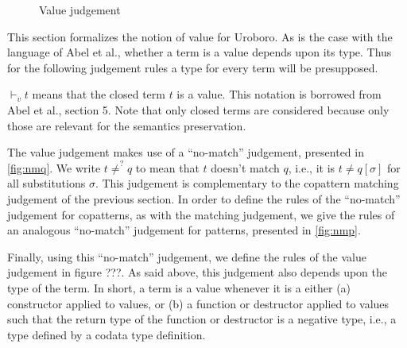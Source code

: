 \begin{figure}
\begin{prooftree}
\end{prooftree}

\begin{prooftree}
\end{prooftree}

\begin{prooftree}
\end{prooftree}
\caption{Value judgement}
\label{fig:valj}
\end{figure}

This section formalizes the notion of value for Uroboro. As is the case with the language of Abel et al.\cite{abel13copatterns}, whether a term is a value depends upon its type. Thus for the following judgement rules a type for every term will be presupposed.

$\vdash_v t$ means that the closed term $t$ is a value. This notation is borrowed from Abel et al.\cite{abel13copatterns}, section 5. Note that only closed terms are considered because only those are relevant for the semantics preservation.

The value judgement makes use of a ``no-match'' judgement, presented in \autoref{fig:nmq}. We write $t \neq^? q$ to mean that $t$ doesn't match $q$, i.e., it is $t \neq q[\sigma]$ for all substitutions $\sigma$. This judgement is complementary to the copattern matching judgement of the previous section. In order to define the rules of the ``no-match'' judgement for copatterns, as with the matching judgement, we give the rules of an analogous ``no-match'' judgement for patterns, presented in \autoref{fig:nmp}.

Finally, using this ``no-match'' judgement, we define the rules of the value judgement in figure ???. As said above, this judgement also depends upon the type of the term. In short, a term is a value whenever it is a either (a) constructor applied to values, or (b) a function or destructor applied to values such that the return type of the function or destructor is a negative type, i.e., a type defined by a codata type definition.

